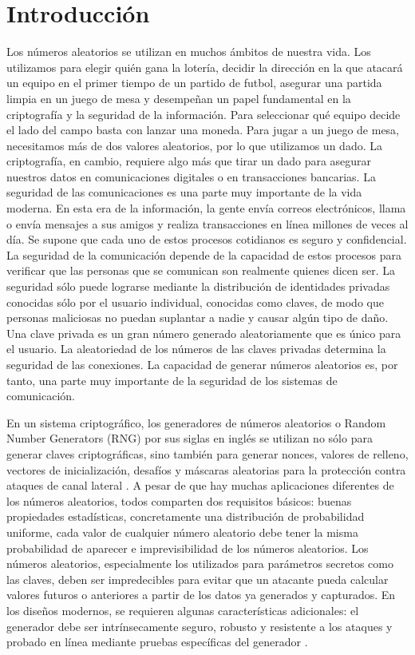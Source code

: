 \chapter{Introducción}
		
	Los números aleatorios se utilizan en muchos ámbitos de nuestra vida. Los utilizamos para elegir quién gana la lotería, decidir la dirección en la que atacará
un equipo en el primer tiempo de un partido de futbol, asegurar una partida limpia en un juego de mesa y desempeñan un papel fundamental en la criptografía y la seguridad de la información. Para seleccionar qué equipo decide el lado del campo basta con lanzar una moneda. Para jugar a un juego de mesa, necesitamos más de dos valores aleatorios, por lo que utilizamos un dado. La criptografía, en cambio, requiere algo más que tirar un dado para asegurar nuestros datos en comunicaciones digitales o en transacciones bancarias. La seguridad de las comunicaciones es una parte muy importante de la vida moderna. En esta era de la información, la gente envía correos electrónicos, llama o envía mensajes a sus amigos y realiza transacciones en línea millones de veces al día. Se supone que cada uno de estos procesos cotidianos es seguro y confidencial. La seguridad de la comunicación depende de la capacidad de estos procesos para verificar que las personas que se comunican son realmente quienes dicen ser. La seguridad sólo puede lograrse mediante la distribución de identidades privadas conocidas sólo por el usuario individual, conocidas como claves, de modo que personas maliciosas no puedan suplantar a nadie y causar algún tipo de daño. Una clave privada es un gran número generado aleatoriamente que es único para el usuario. La aleatoriedad de los números de las claves privadas determina la seguridad de las conexiones. La capacidad de generar números aleatorios es, por tanto, una parte muy importante de la seguridad de los sistemas de comunicación.

	En un sistema criptográfico, los generadores de números aleatorios o Random Number Generators (RNG) por sus siglas en inglés se utilizan no sólo para generar claves criptográficas, sino también para generar nonces, valores de relleno, vectores de inicialización, desafíos y máscaras aleatorias para la protección contra ataques de canal lateral \cite{Petura2016}. A pesar de que hay muchas aplicaciones diferentes de los números aleatorios, todos comparten dos requisitos básicos: buenas propiedades estadísticas, concretamente una distribución de probabilidad uniforme, cada valor de cualquier número aleatorio debe tener la misma probabilidad de aparecer e imprevisibilidad de los números aleatorios. Los números aleatorios, especialmente los utilizados para parámetros secretos como las claves, deben ser impredecibles para evitar que un atacante pueda calcular valores futuros o anteriores a partir de los datos ya generados y capturados. En los diseños modernos, se requieren algunas características adicionales: el generador debe ser intrínsecamente seguro, robusto y resistente a los ataques y probado en línea mediante pruebas específicas del generador \cite{Badrignans2011}.
		
